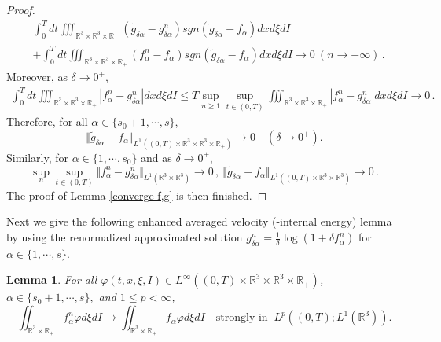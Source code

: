 \documentclass[reqno,11pt]{amsart}
\newtheorem{lemma}{Lemma}[section]
\numberwithin{equation}{section}
\def\R{\mathbb{R}}
\begin{document}
\begin{proof}
\begin{equation*}
  \begin{aligned}
    & \int_0^T dt \iiint_{\R^3 \times \R^3 \times \R_+} (\tilde{g}_{\delta \alpha} - g^n_{\delta \alpha} ) sgn(\tilde{g}_{\delta \alpha}-f_\alpha) dxd\xi dI \\
    & + \int_0^T dt \iiint_{\R^3 \times \R^3 \times \R_+} (f^n_\alpha -f_\alpha) sgn(\tilde{g}_{\delta \alpha}-f_\alpha) dxd\xi dI \to 0 \ (n \to + \infty) \,.
  \end{aligned}
\end{equation*}
Moreover, as $\delta \to 0^+$,
\begin{equation*}
  \begin{aligned}
    \int_0^T dt \iiint_{\R^3 \times \R^3 \times \R_+} |f^n_\alpha -g^n_{\delta \alpha} |dxd\xi dI \leq T \sup \limits_{n \geq 1} \sup \limits_{t\in (0,T)} \iiint_{\R^3 \times \R^3 \times \R_+ } |f^n_\alpha -g^n_{\delta \alpha} |dxd\xi dI \to 0 \,.
  \end{aligned}
\end{equation*}
Therefore, for all $\alpha \in \{s_0+1,\cdots,s\}$,
\begin{equation*}
	\Vert \tilde{g}_{\delta \alpha}-f_\alpha \Vert_{L^1((0,T)\times \R^3 \times \R^3 \times \R_+ )} \rightarrow 0 \quad (\delta \rightarrow 0^+).
\end{equation*}
Similarly, for $\alpha \in \{1,\cdots,s_0\}$ and as $\delta \to 0^+$,
\begin{equation*}
	\sup \limits_{n} \sup \limits_{t\in (0,T)} \Vert f^n_\alpha -g^n_{\delta \alpha} \Vert_{L^1(\R^3 \times \R^3 )} \to 0 \,, \ \Vert \tilde{g}_{\delta \alpha}-f_\alpha \Vert_{L^1((0,T)\times \R^3 \times \R^3 )} \rightarrow 0 \,.
\end{equation*}
The proof of Lemma \ref{converge f,g} is then finished.
\end{proof}

Next we give the following enhanced averaged velocity (-internal energy) lemma by using the renormalized approximated solution $g^n_{\delta \alpha} = \frac{1}{\delta} \log ( 1 + \delta f^n_\alpha )$ for $\alpha \in \{ 1, \cdots, s \}$.

\begin{lemma}\label{theo-6.5}
	For all $\varphi (t,x, \xi, I) \in L^\infty ((0,T)\times \R^3 \times \R^3 \times \R_+)$, $\alpha \in \{s_0+1,\cdots,s\},$ and $1\leq p<\infty $,
	\begin{equation*}
		\iint_{ \R^3 \times \R_+} f^n_\alpha \varphi d\xi dI \rightarrow \iint_{ \R^3 \times \R_+} f_\alpha \varphi d\xi dI \quad \text{strongly in } \  L^p((0,T);L^1(\R^3)).
	\end{equation*}
\end{lemma}
\end{document}
